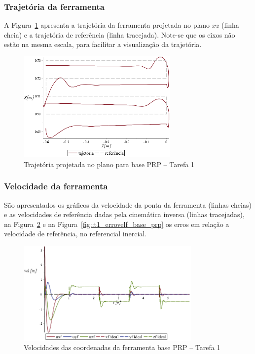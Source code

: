 \subsubsection{Trajetória da ferramenta}

A Figura~\ref{fig::t1_traj_base_prp} apresenta a trajetória da ferramenta
projetada no plano $xz$ (linha cheia) e a trajetória de referência (linha
tracejada).
Note-se que os eixos não estão na mesma escala, para facilitar a visualização da
trajetória.

\begin{figure}[h!]
	\centering 
 	\includegraphics[width=0.70\textwidth]{figs/t1_traj_base_prp}
 	\caption{Trajetória projetada no plano para base PRP -- Tarefa 1}
 	\label{fig::t1_traj_base_prp}
\end{figure}


\subsubsection{Velocidade da ferramenta}

São apresentados os gráficos da velocidade da ponta da ferramenta (linhas
cheias) e as velocidades de referência dadas pela cinemática inversa (linhas
tracejadas), na Figura~\ref{fig::t1_velf_base_prp} e na
Figura~\ref{fig::t1_errovelf_base_prp} os erros em relação a velocidade de
referência, no referencial inercial.

\begin{figure}[h!]
	\centering 
 	\includegraphics[width=0.80\textwidth]{figs/t1_velf_base_prp}
 	\caption{Velocidades das coordenadas da ferramenta base PRP --
 	Tarefa 1}
 	\label{fig::t1_velf_base_prp}
\end{figure}

